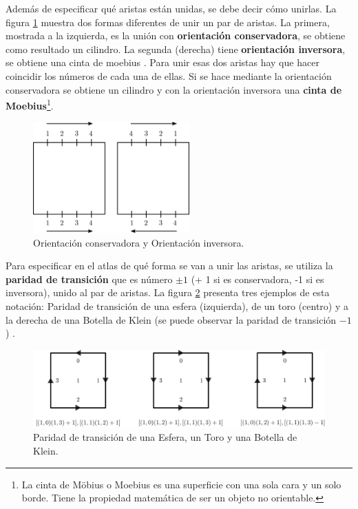 Además de especificar qué aristas están unidas, se debe decir cómo unirlas. La figura \ref{fig:atlas0} muestra dos formas diferentes de unir un par de aristas. La primera, mostrada a la izquierda, es la unión con \textbf{orientación conservadora}, se obtiene como resultado un cilindro. La segunda (derecha) tiene \textbf{orientación inversora}, se obtiene una cinta de moebius \citep{Ramos2011}. Para unir esas dos aristas hay que hacer coincidir los números de cada una de ellas. Si se hace mediante la orientación conservadora se obtiene un cilindro y con la orientación inversora una \textbf{cinta de Moebius}\footnote{La cinta de Möbius o Moebius es una superficie con una sola cara y un solo borde. Tiene la propiedad matemática de ser un objeto no orientable.}.

\begin{figure}[h]
\includegraphics[width=6cm]{Img/GEO/geo-atlas1.jpg}
\centering
\caption{\footnotesize{Orientación conservadora y Orientación inversora.}}
\label{fig:atlas0}
\end{figure}

Para especificar en el atlas de qué forma se van a unir las aristas, se utiliza la \textbf{paridad de transición} que es número $\pm 1$ (+ 1 si es conservadora, -1 si es inversora), unido al par de aristas. La figura \ref{fig:atlas1} presenta tres ejemplos de esta notación: Paridad de transición de una esfera (izquierda), de un toro (centro) y a la derecha de una Botella de Klein (se puede observar la paridad de transición $-1$) \citep{Ramos2011}.

\begin{figure}[h]
\includegraphics[width=15cm]{Img/GEO/atlas3.jpg}
\centering
\caption{\footnotesize{Paridad de transición de una Esfera, un Toro y una Botella de Klein.}}
\label{fig:atlas1}
\end{figure}

